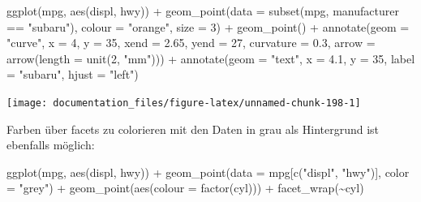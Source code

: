 \documentclass[
]{article}
\newenvironment{Shaded}{\begin{snugshade}}{\end{snugshade}}
\newcommand{\AttributeTok}[1]{\textcolor[rgb]{0.77,0.63,0.00}{#1}}
\newcommand{\DecValTok}[1]{\textcolor[rgb]{0.00,0.00,0.81}{#1}}
\newcommand{\FloatTok}[1]{\textcolor[rgb]{0.00,0.00,0.81}{#1}}
\newcommand{\FunctionTok}[1]{\textcolor[rgb]{0.00,0.00,0.00}{#1}}
\newcommand{\NormalTok}[1]{#1}
\newcommand{\SpecialCharTok}[1]{\textcolor[rgb]{0.00,0.00,0.00}{#1}}
\newcommand{\StringTok}[1]{\textcolor[rgb]{0.31,0.60,0.02}{#1}}
\begin{document}
\begin{Shaded}
\begin{Highlighting}[]
\FunctionTok{ggplot}\NormalTok{(mpg, }\FunctionTok{aes}\NormalTok{(displ, hwy)) }\SpecialCharTok{+}
  \FunctionTok{geom\_point}\NormalTok{(}\AttributeTok{data =} \FunctionTok{subset}\NormalTok{(mpg, manufacturer }\SpecialCharTok{==} \StringTok{"subaru"}\NormalTok{), }
             \AttributeTok{colour =} \StringTok{"orange"}\NormalTok{,}
             \AttributeTok{size =} \DecValTok{3}\NormalTok{) }\SpecialCharTok{+}
  \FunctionTok{geom\_point}\NormalTok{() }\SpecialCharTok{+} 
  \FunctionTok{annotate}\NormalTok{(}\AttributeTok{geom =} \StringTok{"curve"}\NormalTok{, }
           \AttributeTok{x =} \DecValTok{4}\NormalTok{, }\AttributeTok{y =} \DecValTok{35}\NormalTok{, }\AttributeTok{xend =} \FloatTok{2.65}\NormalTok{, }\AttributeTok{yend =} \DecValTok{27}\NormalTok{, }
           \AttributeTok{curvature =} \FloatTok{0.3}\NormalTok{, }\AttributeTok{arrow =} \FunctionTok{arrow}\NormalTok{(}\AttributeTok{length =} \FunctionTok{unit}\NormalTok{(}\DecValTok{2}\NormalTok{, }\StringTok{"mm"}\NormalTok{))) }\SpecialCharTok{+}
  \FunctionTok{annotate}\NormalTok{(}\AttributeTok{geom =} \StringTok{"text"}\NormalTok{, }\AttributeTok{x =} \FloatTok{4.1}\NormalTok{, }\AttributeTok{y =} \DecValTok{35}\NormalTok{, }\AttributeTok{label =} \StringTok{"subaru"}\NormalTok{, }\AttributeTok{hjust =} \StringTok{"left"}\NormalTok{)}
\end{Highlighting}
\end{Shaded}

\begin{center}\texttt{[image: documentation\_files/figure-latex/unnamed-chunk-198-1]} \end{center}

Farben über facets zu colorieren mit den Daten in grau als Hintergrund ist ebenfalls möglich:

\begin{Shaded}
\begin{Highlighting}[]
\FunctionTok{ggplot}\NormalTok{(mpg, }\FunctionTok{aes}\NormalTok{(displ, hwy)) }\SpecialCharTok{+}
  \FunctionTok{geom\_point}\NormalTok{(}\AttributeTok{data =}\NormalTok{ mpg[}\FunctionTok{c}\NormalTok{(}\StringTok{"displ"}\NormalTok{, }\StringTok{"hwy"}\NormalTok{)], }\AttributeTok{color =} \StringTok{"grey"}\NormalTok{) }\SpecialCharTok{+}
  \FunctionTok{geom\_point}\NormalTok{(}\FunctionTok{aes}\NormalTok{(}\AttributeTok{colour =} \FunctionTok{factor}\NormalTok{(cyl))) }\SpecialCharTok{+}
  \FunctionTok{facet\_wrap}\NormalTok{(}\SpecialCharTok{\textasciitilde{}}\NormalTok{cyl)}
\end{Highlighting}
\end{Shaded}
\end{document}
